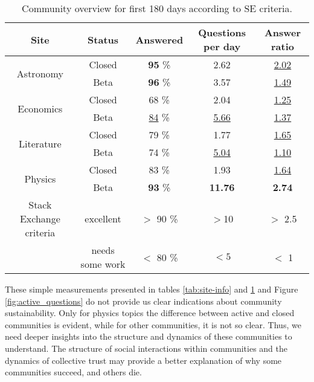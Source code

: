 \begin{table}[h!]
	\caption{Community overview for first 180 days according to SE criteria.}
	
	\label{tab:se_c}
	\begin{tabular}{ccccc}
		\hline
		
		Site & Status &  Answered & Questions per day & Answer ratio \\ \hline
		\multirow{2}{*}{Astronomy} & \multicolumn{1}{c|}{Closed} & \multicolumn{1}{c|}{\textbf{95} \%}  & \multicolumn{1}{c|}{2.62} & \multicolumn{1}{c}{\underline{2.02}} \\
		& \multicolumn{1}{c|}{Beta} & \multicolumn{1}{c|}{\textbf{96} \%}  & \multicolumn{1}{c|}{3.57} & \multicolumn{1}{c}{\underline{1.49}} \\ \hline
		\multirow{2}{*}{Economics} & \multicolumn{1}{c|}{Closed} & \multicolumn{1}{c|}{68 \%}  & \multicolumn{1}{c|}{2.04} & \multicolumn{1}{c}{\underline{1.25}} \\
		& \multicolumn{1}{c|}{Beta} & \multicolumn{1}{c|}{\underline{84} \%}  & \multicolumn{1}{c|}{\underline{5.66}} & \multicolumn{1}{c}{\underline{1.37}} \\ \hline
		\multirow{2}{*}{Literature} & \multicolumn{1}{c|}{Closed} & \multicolumn{1}{c|}{79 \%}  & \multicolumn{1}{c|}{1.77} & \multicolumn{1}{c}{\underline{1.65}} \\
		& \multicolumn{1}{c|}{Beta} & \multicolumn{1}{c|}{74 \%}  & \multicolumn{1}{c|}{\underline{5.04}} & \multicolumn{1}{c}{\underline{1.10}} \\ \hline
		\multirow{2}{*}{Physics} & \multicolumn{1}{c|}{Closed} & \multicolumn{1}{c|}{83 \%}  & \multicolumn{1}{c|}{1.93} & \multicolumn{1}{c}{\underline{1.64}} \\
		& \multicolumn{1}{c|}{Beta} & \multicolumn{1}{c|}{\textbf{93} \%}  & \multicolumn{1}{c|}{\textbf{11.76}} & \multicolumn{1}{c}{ \textbf{2.74}} \\ \hline \hline
		{Stack Exchange criteria} & excellent & $>$ 90 \% & $>$10 & $>$ 2.5   \\
		& needs some work & $<$ 80 \% & $<5$ & $<$ 1   \\ \hline
		
		
	\end{tabular}
	
\end{table}

These simple measurements presented in tables \ref{tab:site-info} and \ref{tab:se_c} and Figure \ref{fig:active_questions} do not provide us clear indications about community sustainability. Only for physics topics the difference between active and closed communities is evident, while for other communities, it is not so clear. Thus, we need deeper insights into the structure and dynamics of these communities to understand. The structure of social interactions within communities and the dynamics of collective trust may provide a better explanation of why some communities succeed, and others die. 